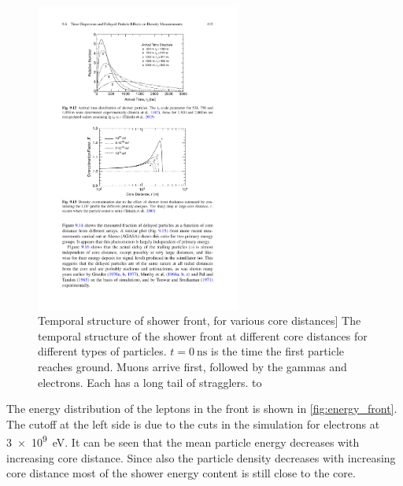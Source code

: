 \begin{figure}
    \centering
    \includegraphics[width=0.6\textwidth]
                    {plots/cosmic-rays/temporal_profile}
    \caption{Temporal structure of shower front, for various core distances]
The temporal structure of the shower front at different core distances for different types of particles. $t = \SI{0}{\ns}$ is the time the first particle reaches ground. Muons arrive first, followed by the gammas and electrons. Each has a long tail of stragglers. \cite{grieder2010eas} to \cite{heck2013corsika}}
    \label{fig:temporal_profile}
\end{figure}


The energy distribution of the leptons in the front is shown in \cref{fig:energy_front}. The cutoff at the left side is due to the cuts in the simulation for electrons at \SI{3e9}{\eV}. It can be seen that the mean particle energy decreases with increasing core distance. Since also the particle density decreases with increasing core distance most of the shower energy content is still close to the core.

